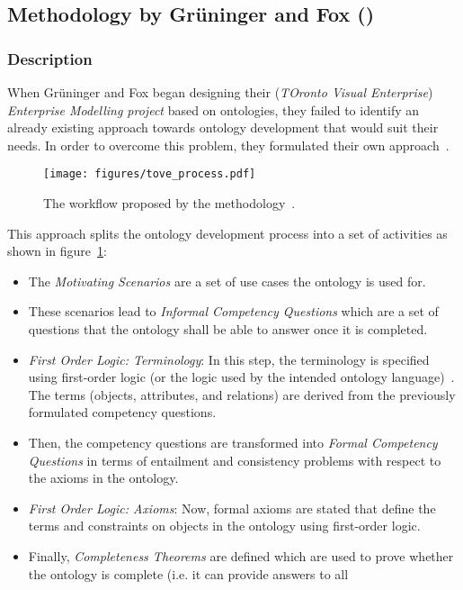 \subsection{Methodology by Grüninger and Fox ()}
\label{subsec:approach4}

\subsubsection{Description}

When Grüninger and Fox began designing their  (\emph{TOronto Visual Enterprise}) \emph{Enterprise Modelling project} based on ontologies, they failed to identify an already existing approach towards ontology development that would suit their needs. In order to overcome this problem, they formulated their own approach~\cite{GruningerFox}.

\begin{figure}
\centering
\texttt{[image: figures/tove\_process.pdf]}
\caption{The workflow proposed by the  methodology~\cite{GruningerFox}.}
\label{fig:tove_process}
\end{figure}


This approach splits the ontology development process into a set of activities as shown in figure~\ref{fig:tove_process}:

\begin{itemize}
  \item The \emph{Motivating Scenarios} are a set of use cases the ontology is used for.
  \item These scenarios lead to \emph{Informal Competency Questions} which are a set of questions that the ontology shall be able to answer once it is completed.
  \item \emph{First Order Logic: Terminology}: In this step, the terminology is specified using first-order logic (or the logic used by the intended ontology language)~\cite{FirstOrderLogic}. The terms (objects, attributes, and relations) are derived from the previously formulated competency questions.
  \item Then, the competency questions are transformed into \emph{Formal Competency Questions} in terms of entailment and consistency problems with respect to the axioms in the ontology.
  \item \emph{First Order Logic: Axioms}: Now, formal axioms are stated that define the terms and constraints on objects in the ontology using first-order logic.
  \item Finally, \emph{Completeness Theorems} are defined which are used to prove whether the ontology is complete (i.e. it can provide answers to all 
\end{itemize}

